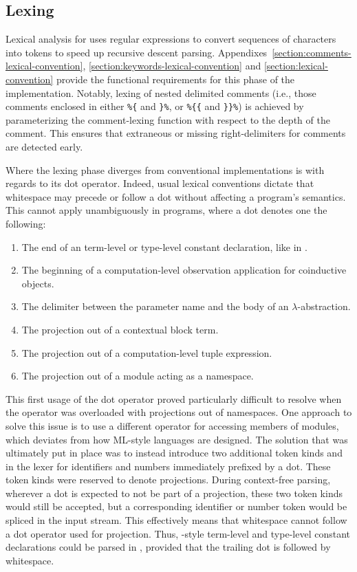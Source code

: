 \subsection{Lexing}

Lexical analysis for \Beluga uses regular expressions to convert sequences of characters into tokens to speed up recursive descent parsing.
Appendixes~\ref{section:comments-lexical-convention}, \ref{section:keywords-lexical-convention} and \ref{section:lexical-convention} provide the functional requirements for this phase of the implementation.
Notably, lexing of nested delimited comments (i.e., those comments enclosed in either \verb|%{| and \verb|}%|, or \verb|%{{| and \verb|}}%|) is achieved by parameterizing the comment-lexing function with respect to the depth of the comment.
This ensures that extraneous or missing right-delimiters for comments are detected early.

Where the lexing phase diverges from conventional implementations is with regards to its dot operator.
Indeed, usual lexical conventions dictate that whitespace may precede or follow a dot without affecting a program's semantics.
This cannot apply unambiguously in \Beluga programs, where a dot denotes one the following:
\begin{enumerate}
\item
The end of an \LF term-level or type-level constant declaration, like in \Twelf.
\item
The beginning of a computation-level observation application for coinductive objects.
\item
The delimiter between the parameter name and the body of an \LF $\lambda$-abstraction.
\item
The projection out of a contextual \LF block term.
\item
The projection out of a computation-level tuple expression.
\item
The projection out of a module acting as a namespace.
\end{enumerate}

This first usage of the dot operator proved particularly difficult to resolve when the operator was overloaded with projections out of namespaces.
One approach to solve this issue is to use a different operator for accessing members of modules, which deviates from how \textsc{ML}-style languages are designed.
The solution that was ultimately put in place was to instead introduce two additional token kinds  and  in the lexer for identifiers and numbers immediately prefixed by a dot.
These token kinds were reserved to denote projections.
During context-free parsing, wherever a dot is expected to not be part of a projection, these two token kinds would still be accepted, but a corresponding identifier or number token would be spliced in the input stream.
This effectively means that whitespace cannot follow a dot operator used for projection.
Thus, \Twelf-style \LF term-level and type-level constant declarations could be parsed in \Beluga, provided that the trailing dot is followed by whitespace.

